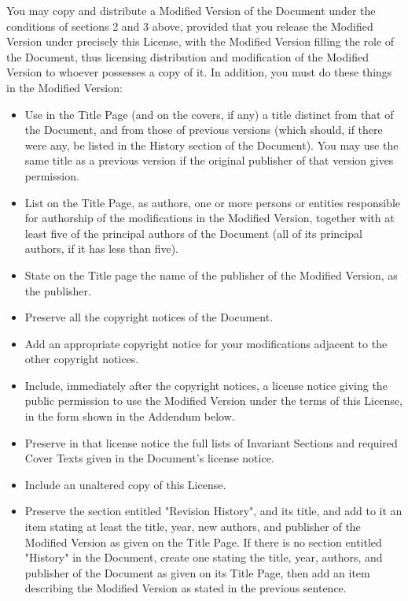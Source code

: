	You may copy and distribute a Modified Version of the Document under the conditions of sections 2 and 3 above, provided that you release the Modified Version under precisely this License, with the Modified Version filling the role of the Document, thus licensing distribution and modification of the Modified Version to whoever possesses a copy of it. In addition, you must do these things in the Modified Version: 
	
	\begin{itemize}
		\item Use in the Title Page (and on the covers, if any) a title distinct from that of the Document, and from those of previous versions (which should, if there were any, be listed in the History section of the Document). You may use the same title as a previous version if the original publisher of that version gives permission. 

		\item List on the Title Page, as authors, one or more persons or entities responsible for authorship of the modifications in the Modified Version, together with at least five of the principal authors of the Document (all of its principal authors, if it has less than five). 

		\item State on the Title page the name of the publisher of the Modified Version, as the publisher. 

		\item Preserve all the copyright notices of the Document. 

		\item Add an appropriate copyright notice for your modifications adjacent to the other copyright notices. 

		\item Include, immediately after the copyright notices, a license notice giving the public permission to use the Modified Version under the terms of this License, in the form shown in the Addendum below. 

		\item Preserve in that license notice the full lists of Invariant Sections and required Cover Texts given in the Document's license notice. 

		\item Include an unaltered copy of this License. 

		\item Preserve the section entitled "Revision History", and its title, and add to it an item stating at least the title, year, new authors, and publisher of the Modified Version as given on the Title Page. If there is no section entitled "History" in the Document, create one stating the title, year, authors, and publisher of the Document as given on its Title Page, then add an item describing the Modified Version as stated in the previous sentence. 


\end{itemize}
